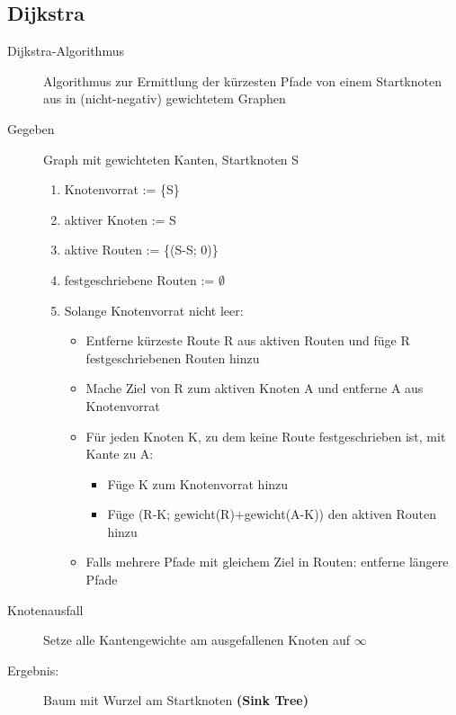 \documentclass[a4paper]{article}
\begin{document}
\subsection{Dijkstra}
\begin{samepage}
\begin{description}
    \item[Dijkstra-Algorithmus] Algorithmus zur Ermittlung der kürzesten Pfade von einem Startknoten aus in (nicht-negativ) gewichtetem Graphen
    \item[Gegeben] Graph mit gewichteten Kanten, Startknoten S
    \begin{enumerate}
        \item Knotenvorrat := \{S\}
        \item aktiver Knoten := S
        \item aktive Routen := \{(S-S; 0)\}
        \item festgeschriebene Routen := $\emptyset$
        \item Solange Knotenvorrat nicht leer:
        \begin{itemize}
            \item Entferne kürzeste Route R aus aktiven Routen und füge R festgeschriebenen Routen hinzu
            \item Mache Ziel von R zum aktiven Knoten A und entferne A aus Knotenvorrat
            \item Für jeden Knoten K, zu dem keine Route festgeschrieben ist, mit Kante zu A:
            \begin{itemize}
                \item Füge K zum Knotenvorrat hinzu
                \item Füge (R-K; gewicht(R)$+$gewicht(A-K)) den aktiven Routen hinzu
            \end{itemize}
            \item Falls mehrere Pfade mit gleichem Ziel in Routen: entferne längere Pfade
        \end{itemize}
    \end{enumerate}
    \item[Knotenausfall] Setze alle Kantengewichte am ausgefallenen Knoten auf $\infty$
    \item[Ergebnis:] Baum mit Wurzel am Startknoten \textbf{(Sink Tree)}
\end{description}
\end{samepage}
\end{document}
